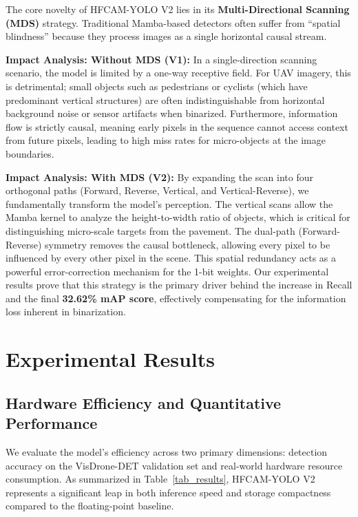 \documentclass[journal]{IEEEtran}
\begin{document}
The core novelty of HFCAM-YOLO V2 lies in its \textbf{Multi-Directional Scanning (MDS)} strategy. Traditional Mamba-based detectors often suffer from ``spatial blindness'' because they process images as a single horizontal causal stream. 

\textbf{Impact Analysis: Without MDS (V1):} In a single-direction scanning scenario, the model is limited by a one-way receptive field. For UAV imagery, this is detrimental; small objects such as pedestrians or cyclists (which have predominant vertical structures) are often indistinguishable from horizontal background noise or sensor artifacts when binarized. Furthermore, information flow is strictly causal, meaning early pixels in the sequence cannot access context from future pixels, leading to high miss rates for micro-objects at the image boundaries.

\textbf{Impact Analysis: With MDS (V2):} By expanding the scan into four orthogonal paths (Forward, Reverse, Vertical, and Vertical-Reverse), we fundamentally transform the model's perception. The vertical scans allow the Mamba kernel to analyze the height-to-width ratio of objects, which is critical for distinguishing micro-scale targets from the pavement. The dual-path (Forward-Reverse) symmetry removes the causal bottleneck, allowing every pixel to be influenced by every other pixel in the scene. This spatial redundancy acts as a powerful error-correction mechanism for the 1-bit weights. Our experimental results prove that this strategy is the primary driver behind the increase in Recall and the final \textbf{32.62\% mAP score}, effectively compensating for the information loss inherent in binarization.



\section{Experimental Results}

\subsection{Hardware Efficiency and Quantitative Performance}
We evaluate the model's efficiency across two primary dimensions: detection accuracy on the VisDrone-DET validation set and real-world hardware resource consumption. As summarized in Table~\ref{tab_results}, HFCAM-YOLO V2 represents a significant leap in both inference speed and storage compactness compared to the floating-point baseline.
\end{document}
